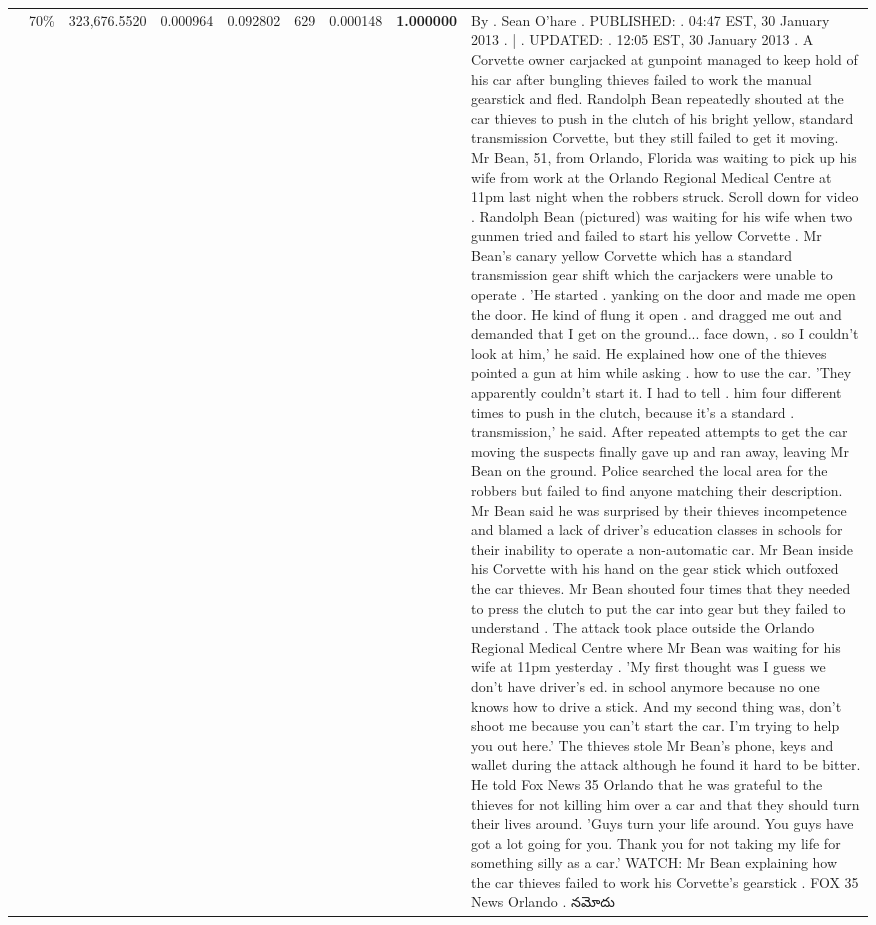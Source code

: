 \begin{table}[H]
\begin{tabular}{llrrrrrrl}
 & 70\% & 323,676.5520 & 0.000964 & 0.092802 & \color{red} 629 & 0.000148 & \bfseries \color{red} 1.000000 & By . Sean O'hare . PUBLISHED: . 04:47 EST, 30 January 2013 . | . UPDATED: . 12:05 EST, 30 January 2013 . A Corvette owner carjacked at gunpoint managed to keep hold of his car after bungling thieves failed to work the manual gearstick and fled. Randolph Bean repeatedly shouted at the car thieves to push in the clutch of his bright yellow, standard transmission Corvette, but they still failed to get it moving. Mr Bean, 51, from Orlando, Florida was waiting to pick up his wife from work at the Orlando Regional Medical Centre at 11pm last night when the robbers struck. Scroll down for video . Randolph Bean (pictured) was waiting for his wife when two gunmen tried and failed to start his yellow Corvette . Mr Bean's canary yellow Corvette which has a standard transmission gear shift which the carjackers were unable to operate . 'He started . yanking on the door and made me open the door. He kind of flung it open . and dragged me out and demanded that I get on the ground... face down, . so I couldn't look at him,' he said. He explained how one of the thieves pointed a gun at him while asking . how to use the car. 'They apparently couldn't start it. I had to tell . him four different times to push in the clutch, because it's a standard . transmission,' he said. After repeated attempts to get the car moving the suspects finally gave up and ran away, leaving Mr Bean on the ground. Police searched the local area for the robbers but failed to find anyone matching their description. Mr Bean said he was surprised by their thieves incompetence and blamed a lack of driver's education classes in schools for their inability to operate a non-automatic car. Mr Bean inside his Corvette with his hand on the gear stick which outfoxed the car thieves. Mr Bean shouted four times that they needed to press the clutch to put the car into gear but they failed to understand . The attack took place outside the Orlando Regional Medical Centre where Mr Bean was waiting for his wife at 11pm yesterday . 'My first thought was I guess we don't have driver's ed. in school anymore because no one knows how to drive a stick. And my second thing was, don't shoot me because you can't start the car. I'm trying to help you out here.' The thieves stole Mr Bean's phone, keys and wallet during the attack although he found it hard to be bitter. He told Fox News 35 Orlando that he was grateful to the thieves for not killing him over a car and that they should turn their lives around. 'Guys turn your life around. You guys have got a lot going for you. Thank you for not taking my life for something silly as a car.' WATCH: Mr Bean explaining how the car thieves failed to work his Corvette's gearstick . FOX 35 News Orlando . నమోదు \\

\end{tabular}
\end{table}
